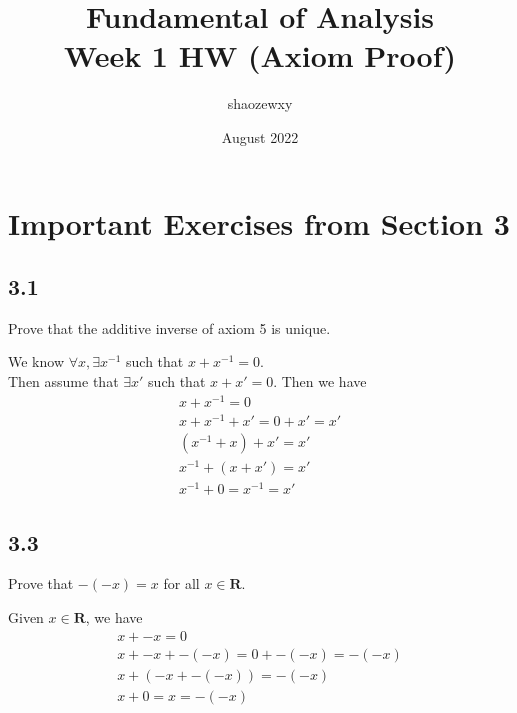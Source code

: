 \documentclass{article}
\title{Fundamental of Analysis\\
\large{Week 1 HW (Axiom Proof)}}
\author{shaozewxy }
\date{August 2022}
\begin{document}
\maketitle

\setcounter{secnumdepth}{0}
\section*{Important Exercises from Section 3}
\subsection*{3.1}
Prove that the additive inverse of axiom 5 is unique.
\begin{addmargin}[1em]{0em}
    We know $\forall x, \exists x^{-1}$ such that $x + x^{-1} = 0$.\\
    Then assume that $\exists x'$ such that $x + x' = 0$. Then we have
    \begin{equation*}
        \begin{split}
            x + x^{-1} = 0\\
            x + x^{-1} + x' = 0 + x' = x'\\
            (x^{-1} + x) + x' = x'\\
            x^{-1} + (x + x') = x'\\
            x^{-1} + 0 = x^{-1} = x'
        \end{split}
    \end{equation*}
\end{addmargin}
\subsection*{3.3}
Prove that $-(-x) = x$ for all $x \in \mathbf{R}$.
\begin{addmargin}[1em]{0em}
    Given $x \in \mathbf{R}$, we have
    \begin{equation*}
        \begin{split}
            x + -x = 0\\
            x + -x + -(-x) = 0 + -(-x) = -(-x)\\
            x + (-x + -(-x)) = -(-x)\\
            x + 0  = x = -(-x)
        \end{split}
    \end{equation*}
\end{addmargin}
\end{document}
